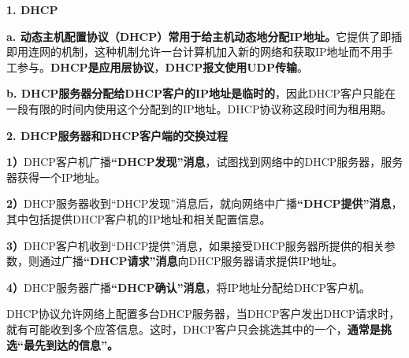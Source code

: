 \textbf{{1. DHCP}}

\textbf{{a.
动态主机配置协议（DHCP）常用于给主机动态地分配IP地址。}}它提供了即插即用连网的机制，这种机制允许一台计算机加入新的网络和获取IP地址而不用手工参与。\textbf{DHCP是应用层协议}，\textbf{DHCP报文使用UDP传输}。

\textbf{b.
DHCP服务器分配给DHCP客户的IP地址是临时的}，因此DHCP客户只能在一段有限的时间内使用这个分配到的IP地址。DHCP协议称这段时间为租用期。

\textbf{{2. DHCP服务器和DHCP客户端的交换过程}}

\textbf{1）}DHCP客户机广播\textbf{``DHCP发现''消息}，试图找到网络中的DHCP服务器，服务器获得一个IP地址。

\textbf{2）}DHCP服务器收到``DHCP发现''消息后，就向网络中广播\textbf{``DHCP提供''消息}，其中包括提供DHCP客户机的IP地址和相关配置信息。

\textbf{3）}DHCP客户机收到``DHCP提供''消息，如果接受DHCP服务器所提供的相关参数，则通过广播\textbf{``DHCP请求''消息}向DHCP服务器请求提供IP地址。

\textbf{4）}DHCP服务器广播\textbf{``DHCP确认''消息}，将IP地址分配给DHCP客户机。

DHCP协议允许网络上配置多台DHCP服务器，当DHCP客户发出DHCP请求时，就有可能收到多个应答信息。这时，DHCP客户只会挑选其中的一个，\textbf{通常是挑选``最先到达的信息''。}\\
